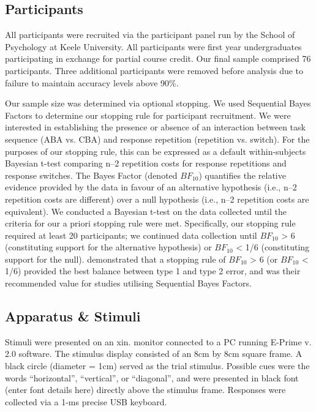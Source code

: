 \documentclass[a4paper, doc, natbib]{apa6}
\begin{document}
\subsection{Participants}
All participants were recruited via the participant panel run by the School of Psychology at Keele University. All participants were first year undergraduates participating in exchange for partial course credit. Our final sample comprised 76 participants. Three additional participants were removed before analysis due to failure to maintain accuracy levels above 90\%.

Our sample size was determined via optional stopping. We used Sequential Bayes Factors \citep{Schoenbrodtinpress} to determine our stopping rule for participant recruitment. We were interested in establishing the presence or absence of an interaction between task sequence (ABA vs. CBA) and response repetition (repetition vs. switch). For the purposes of our stopping rule, this can be expressed as a default within-subjects Bayesian t-test \citep{Rouder2009} comparing n--2 repetition costs for response repetitions and response switches. The Bayes Factor (denoted $BF_{10}$) quantifies the relative evidence provided by the data in favour of an alternative hypothesis (i.e., n--2 repetition costs are different) over a null hypothesis (i.e., n--2 repetition costs are equivalent). We conducted a Bayesian t-test on the data collected until the criteria for our a priori stopping rule were met. Specifically, our stopping rule required at least 20 participants; we continued data collection until $BF_{10}$ > 6 (constituting support for the alternative hypothesis) or $BF_{10}$ < 1/6 (constituting support for the null). \cite{Schoenbrodtinpress} demonstrated that a stopping rule of $BF_{10}$ > 6 (or $BF_{10}$ < 1/6) provided the best balance between type 1 and type 2 error, and was their recommended value for studies utilising Sequential Bayes Factors. 

\subsection{Apparatus \& Stimuli}
Stimuli were presented on an xin. monitor connected to a PC running E-Prime v. 2.0 software. The stimulus display consisted of an 8cm by 8cm square frame. A black circle (diameter = 1cm) served as the trial stimulus. Possible cues were the words ``horizontal'', ``vertical'', or ``diagonal'', and were presented in black font (enter font details here) directly above the stimulus frame. Responses were collected via a 1-ms precise USB keyboard.
\end{document}
